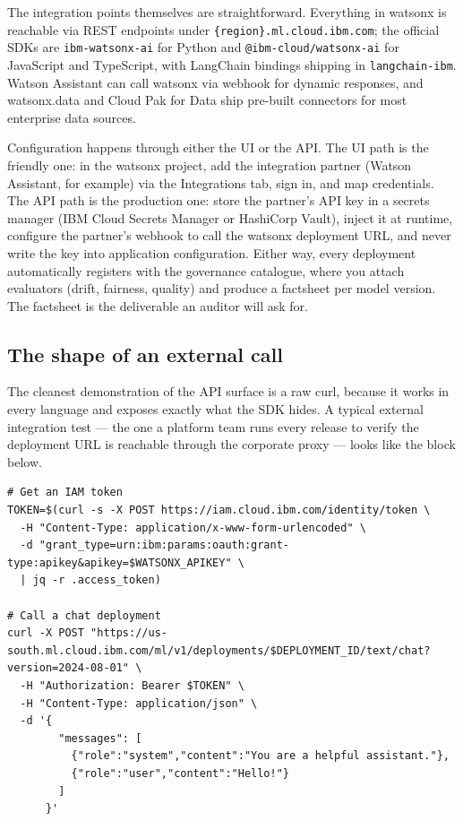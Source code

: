 The integration points themselves are straightforward. Everything in watsonx is reachable via REST endpoints under \texttt{\{region\}.ml.cloud.ibm.com}; the official SDKs are \texttt{ibm-watsonx-ai} for Python and \texttt{@ibm-cloud/watsonx-ai} for JavaScript and TypeScript, with LangChain bindings shipping in \texttt{langchain-ibm}. Watson Assistant can call watsonx via webhook for dynamic responses, and watsonx.data and Cloud Pak for Data ship pre-built connectors for most enterprise data sources.

Configuration happens through either the UI or the API. The UI path is the friendly one: in the watsonx project, add the integration partner (Watson Assistant, for example) via the Integrations tab, sign in, and map credentials. The API path is the production one: store the partner's API key in a secrets manager (IBM Cloud Secrets Manager or HashiCorp Vault), inject it at runtime, configure the partner's webhook to call the watsonx deployment URL, and never write the key into application configuration. Either way, every deployment automatically registers with the governance catalogue, where you attach evaluators (drift, fairness, quality) and produce a factsheet per model version. The factsheet is the deliverable an auditor will ask for.

\subsection{The shape of an external call}

The cleanest demonstration of the API surface is a raw curl, because it works in every language and exposes exactly what the SDK hides. A typical external integration test --- the one a platform team runs every release to verify the deployment URL is reachable through the corporate proxy --- looks like the block below.

\begin{examplebox}[title=\textbf{Authenticated REST call from any language (curl)}]
\begin{lstlisting}
# Get an IAM token
TOKEN=$(curl -s -X POST https://iam.cloud.ibm.com/identity/token \
  -H "Content-Type: application/x-www-form-urlencoded" \
  -d "grant_type=urn:ibm:params:oauth:grant-type:apikey&apikey=$WATSONX_APIKEY" \
  | jq -r .access_token)

# Call a chat deployment
curl -X POST "https://us-south.ml.cloud.ibm.com/ml/v1/deployments/$DEPLOYMENT_ID/text/chat?version=2024-08-01" \
  -H "Authorization: Bearer $TOKEN" \
  -H "Content-Type: application/json" \
  -d '{
        "messages": [
          {"role":"system","content":"You are a helpful assistant."},
          {"role":"user","content":"Hello!"}
        ]
      }'
\end{lstlisting}
\end{examplebox}

